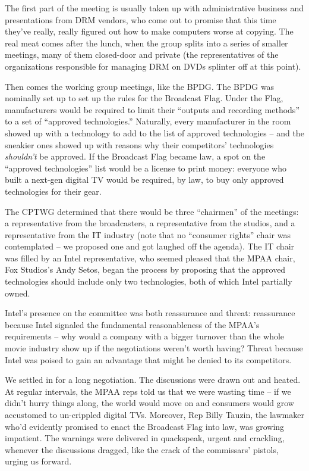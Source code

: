 The first part of the meeting is usually taken up with
administrative business and presentations from DRM vendors, who
come out to promise that this time they've really, really figured
out how to make computers worse at copying. The real meat comes
after the lunch, when the group splits into a series of smaller
meetings, many of them closed-door and private (the representatives
of the organizations responsible for managing DRM on DVDs splinter
off at this point).

Then comes the working group meetings, like the BPDG. The BPDG was
nominally set up to set up the rules for the Broadcast Flag. Under
the Flag, manufacturers would be required to limit their ``outputs
and recording methods'' to a set of ``approved technologies.''
Naturally, every manufacturer in the room showed up with a
technology to add to the list of approved technologies -- and the
sneakier ones showed up with reasons why their competitors'
technologies \emph{shouldn't} be approved. If the Broadcast Flag
became law, a spot on the ``approved technologies'' list would be a
license to print money: everyone who built a next-gen digital TV
would be required, by law, to buy only approved technologies for
their gear.

The CPTWG determined that there would be three ``chairmen'' of the
meetings: a representative from the broadcasters, a representative
from the studios, and a representative from the IT industry (note
that no ``consumer rights'' chair was contemplated -- we proposed one
and got laughed off the agenda). The IT chair was filled by an
Intel representative, who seemed pleased that the MPAA chair, Fox
Studios's Andy Setos, began the process by proposing that the
approved technologies should include only two technologies, both of
which Intel partially owned.

Intel's presence on the committee was both reassurance and threat:
reassurance because Intel signaled the fundamental reasonableness
of the MPAA's requirements -- why would a company with a bigger
turnover than the whole movie industry show up if the negotiations
weren't worth having? Threat because Intel was poised to gain an
advantage that might be denied to its competitors.

We settled in for a long negotiation. The discussions were drawn
out and heated. At regular intervals, the MPAA reps told us that we
were wasting time -- if we didn't hurry things along, the world
would move on and consumers would grow accustomed to un-crippled
digital TVs. Moreover, Rep Billy Tauzin, the lawmaker who'd
evidently promised to enact the Broadcast Flag into law, was
growing impatient. The warnings were delivered in quackspeak,
urgent and crackling, whenever the discussions dragged, like the
crack of the commissars' pistols, urging us forward.


